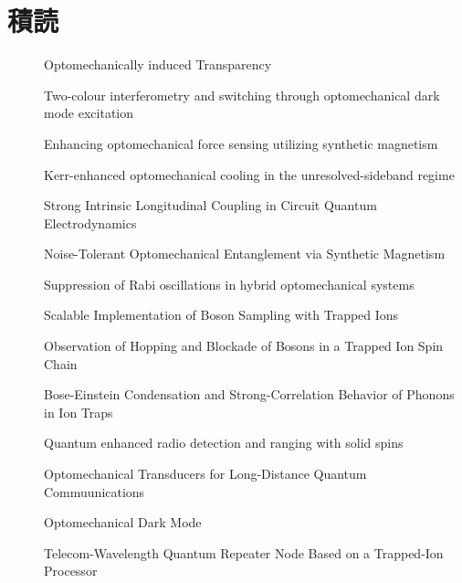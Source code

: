 \documentclass{report}
\begin{document}
  \chapter{積読}
    \begin{description}
      \item[\cite{science.1195596}] Optomechanically induced Transparency
      \item[\cite{lake2020two}] Two-colour interferometry and switching through optomechanical dark mode excitation
      \item[\cite{PhysRevA.111.053508}] Enhancing optomechanical force sensing utilizing synthetic magnetism
      \item[\cite{PhysRevA.111.053505}] Kerr-enhanced optomechanical cooling in the unresolved-sideband regime
      \item[\cite{PhysRevLett.134.153603}] Strong Intrinsic Longitudinal Coupling in Circuit Quantum Electrodynamics
      \item[\cite{PhysRevLett.129.063602}] Noise-Tolerant Optomechanical Entanglement via Synthetic Magnetism
      \item[\cite{PhysRevA.92.043822}] Suppression of Rabi oscillations in hybrid optomechanical systems
      \item[\cite{PhysRevLett.112.050504}] Scalable Implementation of Boson Sampling with Trapped Ions
      \item[\cite{PhysRevLett.120.073001}] Observation of Hopping and Blockade of Bosons in a Trapped Ion Spin Chain
      \item[\cite{PhysRevLett.93.263602}] Bose-Einstein Condensation and Strong-Correlation Behavior of Phonons in Ion Traps
      \item[\cite{chen2023quantum}] Quantum enhanced radio detection and ranging with solid spins
      \item[\cite{PhysRevLett.105.220501}] Optomechanical Transducers for Long-Distance Quantum Commuunications
      \item[\cite{science.1228370}] Optomechanical Dark Mode
      \item[\cite{PhysRevLett.130.213601}] Telecom-Wavelength Quantum Repeater Node Based on a Trapped-Ion Processor
    \end{description}
  \printbibliography
\end{document}
